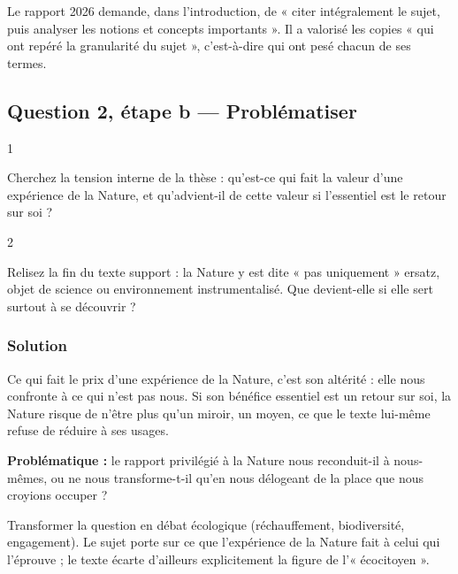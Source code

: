 \documentclass[11pt,a4paper]{article}
\begin{document}
\begin{jury}

Le rapport 2026 demande, dans l'introduction, de « citer intégralement le sujet, puis analyser les notions et concepts importants ». Il a valorisé les copies « qui ont repéré la granularité du sujet », c'est-à-dire qui ont pesé chacun de ses termes.

\end{jury}

\hypertarget{question-2-uxe9tape-b-probluxe9matiser}{%
\subsection{Question 2, étape b --- Problématiser}\label{question-2-uxe9tape-b-probluxe9matiser}}

\begin{indication}{1}

Cherchez la tension interne de la thèse : qu'est-ce qui fait la valeur d'une expérience de la Nature, et qu'advient-il de cette valeur si l'essentiel est le retour sur soi ?

\end{indication}

\begin{indication}{2}

Relisez la fin du texte support : la Nature y est dite « pas uniquement » ersatz, objet de science ou environnement instrumentalisé. Que devient-elle si elle sert surtout à se découvrir ?

\end{indication}

\hypertarget{solution-4}{%
\subsubsection{Solution}\label{solution-4}}

Ce qui fait le prix d'une expérience de la Nature, c'est son altérité : elle nous confronte à ce qui n'est pas nous. Si son bénéfice essentiel est un retour sur soi, la Nature risque de n'être plus qu'un miroir, un moyen, ce que le texte lui-même refuse de réduire à ses usages.

\textbf{Problématique :} le rapport privilégié à la Nature nous reconduit-il à nous-mêmes, ou ne nous transforme-t-il qu'en nous délogeant de la place que nous croyions occuper ?

\begin{piege}

Transformer la question en débat écologique (réchauffement, biodiversité, engagement). Le sujet porte sur ce que l'expérience de la Nature fait à celui qui l'éprouve ; le texte écarte d'ailleurs explicitement la figure de l'« écocitoyen ».

\end{piege}
\end{document}
